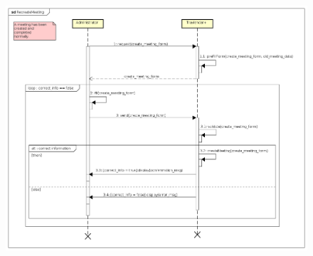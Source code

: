 \begin{figure}[H]
	\centering\includegraphics[width=\textwidth]{Images/SequenceDiagrams/Admin/RecreateMeeting.png}{}
	\caption{}
\end{figure}

